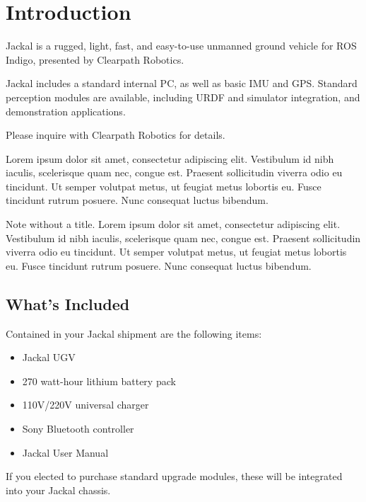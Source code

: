 \documentclass[]{clearpath-manual}
\begin{document}
\tableofcontents

\section{Introduction}

Jackal is a rugged, light, fast, and easy-to-use unmanned ground vehicle for ROS
Indigo, presented by Clearpath Robotics.

Jackal includes a standard internal PC, as well as basic IMU and GPS. Standard
perception modules are available, including URDF and simulator integration, and
demonstration applications.

Please inquire with Clearpath Robotics for details.

\begin{note}
Lorem ipsum dolor sit amet, consectetur adipiscing elit. Vestibulum id
nibh iaculis, scelerisque quam nec, congue est. Praesent sollicitudin viverra odio
eu tincidunt. Ut semper volutpat metus, ut feugiat metus lobortis eu. Fusce tincidunt
rutrum posuere. Nunc consequat luctus bibendum.
\end{note}

\begin{note}
Note without a title. Lorem ipsum dolor sit amet, consectetur adipiscing elit. Vestibulum id
nibh iaculis, scelerisque quam nec, congue est. Praesent sollicitudin viverra odio
eu tincidunt. Ut semper volutpat metus, ut feugiat metus lobortis eu. Fusce tincidunt
rutrum posuere. Nunc consequat luctus bibendum.
\end{note}

\subsection{What's Included}

Contained in your Jackal shipment are the following items:

\begin{itemize}
  \item Jackal UGV
  \item 270 watt-hour lithium battery pack
  \item 110V/220V universal charger
  \item Sony Bluetooth controller
  \item Jackal User Manual
\end{itemize}

If you elected to purchase standard upgrade modules, these will be integrated into your Jackal chassis.
\end{document}
